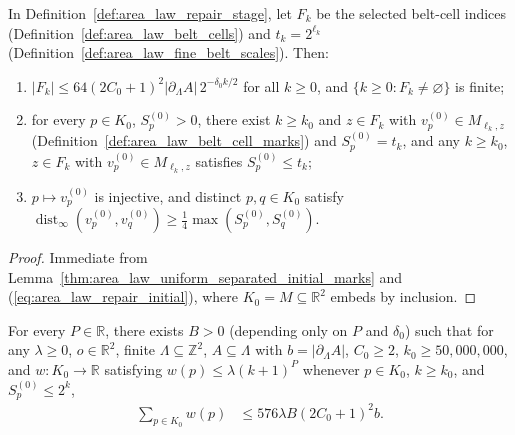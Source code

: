 \begin{lemma}
    \label{thm:area_law_initial_repair_mark_facts}
    \leanok
    In Definition~\ref{def:area_law_repair_stage}, let $F_k$ be the selected belt-cell indices
    (Definition~\ref{def:area_law_belt_cells}) and $t_k=2^{\ell_k}$
    (Definition~\ref{def:area_law_fine_belt_scales}). Then:
    \begin{enumerate}
        \item $|F_k|\le64(2C_0+1)^2|\partial_\Lambda A|\,2^{-\delta_0 k/2}$ for all $k\ge0$, and
              $\{k\ge0:F_k\ne\varnothing\}$ is finite;
        \item for every $p\in K_0$, $S_p^{(0)}>0$, there exist $k\ge k_0$ and $z\in F_k$ with
              $v_p^{(0)}\in M_{\ell_k,z}$ (Definition~\ref{def:area_law_belt_cell_marks}) and
              $S_p^{(0)}=t_k$, and any $k\ge k_0$, $z\in F_k$ with $v_p^{(0)}\in M_{\ell_k,z}$
              satisfies $S_p^{(0)}\le t_k$;
        \item $p\mapsto v_p^{(0)}$ is injective, and distinct $p,q\in K_0$ satisfy
              $\operatorname{dist}_\infty(v_p^{(0)},v_q^{(0)})\ge\frac14\max(S_p^{(0)},S_q^{(0)})$.
    \end{enumerate}
\end{lemma}

\begin{proof}\leanok
    Immediate from Lemma~\ref{thm:area_law_uniform_separated_initial_marks} and
    (\ref{eq:area_law_repair_initial}), where $K_0=M\subseteq\mathbb R^2$ embeds by inclusion.
\end{proof}
\begin{lemma}
    \label{thm:area_law_initial_repair_weighted_sum}
    \leanok
    For every $P\in\mathbb R$, there exists $B>0$ (depending only on $P$ and $\delta_0$) such that
    for any $\lambda\ge0$, $o\in\mathbb R^2$, finite $\Lambda\subseteq\mathbb Z^2$,
    $A\subseteq\Lambda$ with $b=|\partial_\Lambda A|$, $C_0\ge2$, $k_0\ge50{,}000{,}000$, and
    $w:K_0\to\mathbb R$ satisfying $w(p)\le\lambda(k+1)^P$ whenever $p\in K_0$, $k\ge k_0$, and
    $S_p^{(0)}\le2^k$,
    \begin{align}
        \sum_{p\in K_0}w(p)
         & \le576\lambda B(2C_0+1)^2b.
        \label{eq:area_law_initial_repair_weighted_sum}
    \end{align}
\end{lemma}

